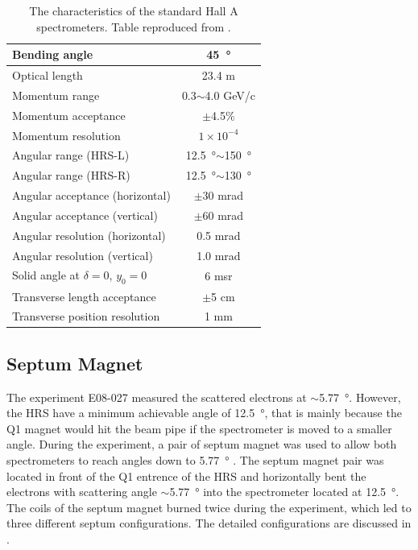 \begin{table}[p!]
  \centering
  \begin{tabular}{|l|c|}
    \hline\hline
    Bending angle & \SI{45}{\degree} \\ \hline
    Optical length & 23.4 m \\ \hline
    Momentum range & 0.3$\sim$4.0 GeV/c \\ \hline
    Momentum acceptance & $\pm$4.5\% \\ \hline
    Momentum resolution & $1\times10^{-4}$ \\ \hline
    Angular range (HRS-L) & \SI{12.5}{\degree}$\sim$\SI{150}{\degree} \\ \hline
    Angular range (HRS-R) & \SI{12.5}{\degree}$\sim$\SI{130}{\degree} \\ \hline
    Angular acceptance (horizontal) & $\pm$30 mrad \\ \hline
    Angular acceptance (vertical) & $\pm$60 mrad \\ \hline
    Angular resolution (horizontal) & 0.5 mrad \\ \hline
    Angular resolution (vertical) & 1.0 mrad \\ \hline
    Solid angle at $\delta=0$, $y_0=0$ & 6 msr \\ \hline
    Transverse length acceptance & $\pm$5 cm \\ \hline
    Transverse position resolution & 1 mm \\ \hline
  \end{tabular}
  \caption[The characteristics of the HRS.]{The characteristics of the standard Hall A spectrometers. Table reproduced from \cite{Alcorn2004}. \label{C5S4T1}}
\end{table}

\subsection{Septum Magnet}
\label{C5S4SS1}

The experiment E08-027 measured the scattered electrons at $\sim$\SI{5.77}{\degree}. However, the HRS have a minimum achievable angle of \SI{12.5}{\degree}, that is mainly because the Q1 magnet would hit the beam pipe if the spectrometer is moved to a smaller angle. During the experiment, a pair of septum magnet was used to allow both spectrometers to reach angles down to \SI{5.77}{\degree} \cite{G2P}. The septum magnet pair was located in front of the Q1 entrence of the HRS and horizontally bent the electrons with scattering angle $\sim$\SI{5.77}{\degree} into the spectrometer located at \SI{12.5}{\degree}. The coils of the septum magnet burned twice during the experiment, which led to three different septum configurations. The detailed configurations are discussed in .

